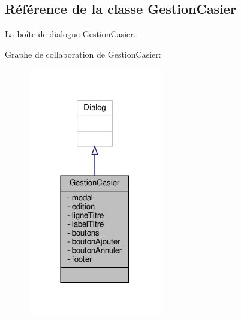 \hypertarget{class_gestion_casier}{}\subsection{Référence de la classe Gestion\+Casier}
\label{class_gestion_casier}


La boîte de dialogue \hyperlink{class_gestion_casier}{Gestion\+Casier}.  




Graphe de collaboration de Gestion\+Casier\+:\nopagebreak
\begin{figure}[H]
\begin{center}
\leavevmode
\includegraphics[width=165pt]{class_gestion_casier__coll__graph}
\end{center}
\end{figure}
